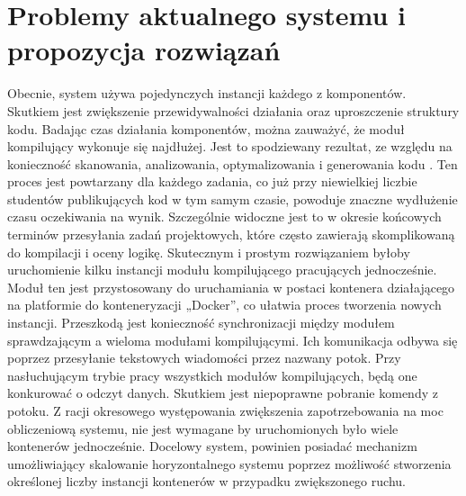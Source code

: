 \section{Problemy aktualnego systemu i propozycja rozwiązań}
\indent Obecnie, system używa pojedynczych instancji każdego z komponentów. Skutkiem jest zwiększenie przewidywalności działania oraz uproszczenie struktury kodu. Badając czas działania komponentów, można zauważyć, że moduł kompilujący wykonuje się najdłużej. Jest to spodziewany rezultat, ze względu na konieczność skanowania, analizowania, optymalizowania i generowania kodu \cite{procesKompilacji}. Ten proces jest powtarzany dla każdego zadania, co już przy niewielkiej liczbie studentów publikujących kod w tym samym czasie, powoduje znaczne wydłużenie czasu oczekiwania na wynik. Szczególnie widoczne jest to w okresie końcowych terminów przesyłania zadań projektowych, które często zawierają skomplikowaną do kompilacji i oceny logikę. Skutecznym i prostym rozwiązaniem byłoby uruchomienie kilku instancji modułu kompilującego pracujących jednocześnie. Moduł ten jest przystosowany do uruchamiania w postaci kontenera działającego na platformie do konteneryzacji „Docker”, co ułatwia proces tworzenia nowych instancji. Przeszkodą jest konieczność synchronizacji między modułem sprawdzającym a wieloma modułami kompilującymi. Ich komunikacja odbywa się poprzez przesyłanie tekstowych wiadomości przez nazwany potok. Przy nasłuchującym trybie pracy wszystkich modułów kompilujących, będą one konkurować o odczyt danych. Skutkiem jest niepoprawne pobranie komendy z potoku. Z racji okresowego występowania zwiększenia zapotrzebowania na moc obliczeniową systemu, nie jest wymagane by uruchomionych było wiele kontenerów jednocześnie. Docelowy system, powinien posiadać mechanizm umożliwiający skalowanie horyzontalnego systemu poprzez możliwość stworzenia określonej liczby instancji kontenerów w przypadku zwiększonego ruchu.
